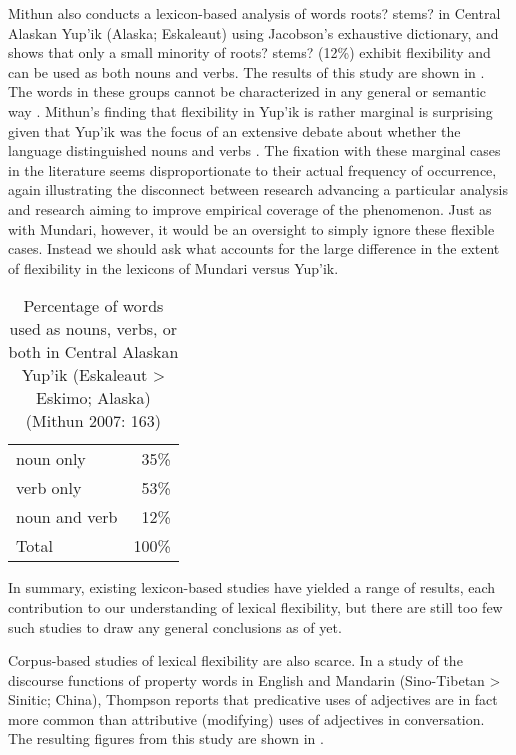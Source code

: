 Mithun  also conducts a lexicon-based analysis of words {{roots? stems?}} in Central Alaskan Yup'ik (Alaska; Eskaleaut) using Jacobson's  exhaustive dictionary, and shows that only a small minority of {{roots? stems?}} (12\%) exhibit flexibility and can be used as both nouns and verbs. The results of this study are shown in . The words in these groups cannot be characterized in any general or semantic way . Mithun's finding that flexibility in Yup'ik is rather marginal is surprising given that Yup'ik was the focus of an extensive debate about whether the language distinguished nouns and verbs . The fixation with these marginal cases in the literature seems disproportionate to their actual frequency of occurrence, again illustrating the disconnect between research advancing a particular analysis and research aiming to improve empirical coverage of the phenomenon. Just as with Mundari, however, it would be an oversight to simply ignore these flexible cases. Instead we should ask what accounts for the large difference in the extent of flexibility in the lexicons of Mundari versus Yup'ik.

\begin{table}[h]
  \centering
  \caption[Percentage of words used as nouns, verbs, or both in Central Alaskan Yup'ik (Eskaleaut > Eskimo; Alaska)]{Percentage of words used as nouns, verbs, or both in Central Alaskan Yup'ik (Eskaleaut > Eskimo; Alaska) (Mithun 2007: 163)}
  \label{tab:Mithun-2017}
  \begin{tabular}{ l r }
    \toprule
    noun only     &  35\% \\
    verb only     &  53\% \\
    noun and verb &  12\% \\
    \midrule
    Total         & 100\% \\
    \bottomrule
  \end{tabular}
\end{table}


In summary, existing lexicon-based studies have yielded a range of results, each contribution to our understanding of lexical flexibility, but there are still too few such studies to draw any general conclusions as of yet.

Corpus-based studies of lexical flexibility are also scarce. In a study of the discourse functions of property words in English and Mandarin (Sino-Tibetan > Sinitic; China), Thompson  reports that predicative uses of adjectives are in fact more common than attributive (modifying) uses of adjectives in conversation. The resulting figures from this study are shown in .

